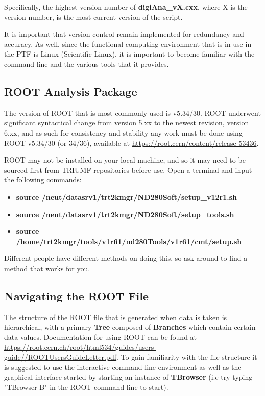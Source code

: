 \documentclass[twoside,letterpaper]{refart}
\begin{document}
Specifically, the highest version number of \textbf{digiAna\_vX.cxx}, where X is the version number, is the most current version of the script.

It is important that version control remain implemented for redundancy and accuracy. As well, since the functional computing environment that is in use in the PTF is Linux (Scientific Linux), it is important to become familiar with the command line and the various tools that it provides.  

\subsection{ROOT Analysis Package}

The version of ROOT that is most commonly used is v5.34/30.  ROOT underwent significant syntactical change from version 5.xx to the newest revision, version 6.xx, and as such for consistency and stability any work must be done using ROOT v5.34/30 (or 34/36), available at \url{https://root.cern/content/release-53436}. 

ROOT may not be installed on your local machine, and so it may need to be sourced first from TRIUMF repositories before use. Open a terminal and input the following commands:

\begin{itemize}
	\item \textbf{source /neut/datasrv1/trt2kmgr/ND280Soft/setup\_v12r1.sh}
	\item \textbf{source /neut/datasrv1/trt2kmgr/ND280Soft/setup\_tools.sh}
	\item \textbf{source /home/trt2kmgr/tools/v1r61/nd280Tools/v1r61/cmt/setup.sh}
\end{itemize}
	
Different people have different methods on doing this, so ask around to find a method that works for you.

\subsection{Navigating the ROOT File}

The structure of the ROOT file that is generated when data is taken is hierarchical, with a primary \textbf{Tree} composed of \textbf{Branches} which contain certain data values.  Documentation for using ROOT can be found at \url{https://root.cern.ch/root/html534/guides/users-guide//ROOTUsersGuideLetter.pdf}. To gain familiarity with the file structure it is suggested to use the interactive command line environment as well as the graphical interface started by starting an instance of \textbf{TBrowser} (i.e try typing "TBrowser B" in the ROOT command line to start).
\end{document}

